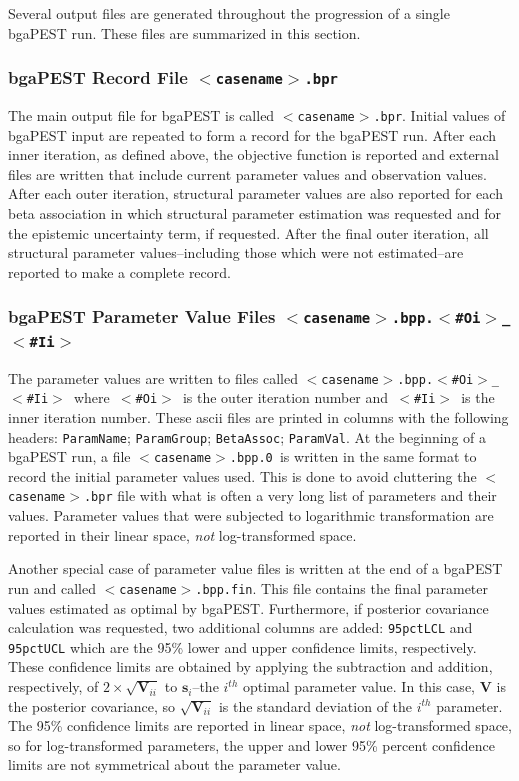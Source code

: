 \documentclass[11pt,oneside,onecolumn]{usgsreport}
\begin{document}
\begin{multicols}{2}
Several output files are generated throughout the progression of a
single bgaPEST run. These files are summarized in this section.


\subsubsection{bgaPEST Record File \texttt{$<$casename$>$.bpr}}

The main output file for bgaPEST is called \texttt{$<$casename$>$.bpr}.
Initial values of bgaPEST input are repeated to form a record for
the bgaPEST run. After each inner iteration, as defined above, the
objective function is reported and external files are written that
include current parameter values and observation values. After each
outer iteration, structural parameter values are also reported for
each beta association in which structural parameter estimation was
requested and for the epistemic uncertainty term, if requested. After
the final outer iteration, all structural parameter values--including
those which were not estimated--are reported to make a complete record.


\subsubsection{bgaPEST Parameter Value Files \texttt{$<$casename$>$.bpp.$<$\#Oi$>$\_$<$\#Ii$>$}}

The parameter values are written to files called \texttt{$<$casename$>$.bpp.$<$\#Oi$>$\_$<$\#Ii$>$
}where\texttt{ $<$\#Oi$>$ }is the outer iteration number and\texttt{ $<$\#Ii$>$
}is the inner iteration number. These ascii files are printed in columns
with the following headers: \texttt{ParamName}; \texttt{ParamGroup};
\texttt{BetaAssoc}; \texttt{ParamVal}. At the beginning of a bgaPEST
run, a file \texttt{$<$casename$>$.bpp.0 }is written in the same format
to record the initial parameter values used. This is done to avoid
cluttering the \texttt{$<$casename$>$.bpr} file with what is often a very
long list of parameters and their values. Parameter values that were
subjected to logarithmic transformation are reported in their linear
space, \emph{not }log-transformed space.

Another special case of parameter value files is written at the end
of a bgaPEST run and called \texttt{$<$casename$>$.bpp.fin}. This file
contains the final parameter values estimated as optimal by bgaPEST.
Furthermore, if posterior covariance calculation was requested, two
additional columns are added: \texttt{95pctLCL} and \texttt{95pctUCL}
which are the 95\% lower and upper confidence limits, respectively.
These confidence limits are obtained by applying the subtraction and
addition, respectively, of $2\times\sqrt{\mathbf{V}_{ii}}$ to $\mathbf{s}_{i}$--the
$i^{th}$ optimal parameter value. In this case, $\mathbf{V}$ is
the posterior covariance, so $\sqrt{\mathbf{V}_{ii}}$ is the standard
deviation of the $i^{th}$ parameter. The 95\% confidence limits are
reported in linear space, \emph{not} log-transformed space, so for
log-transformed parameters, the upper and lower 95\% percent confidence
limits are not symmetrical about the parameter value. 



\end{multicols}
\end{document}
